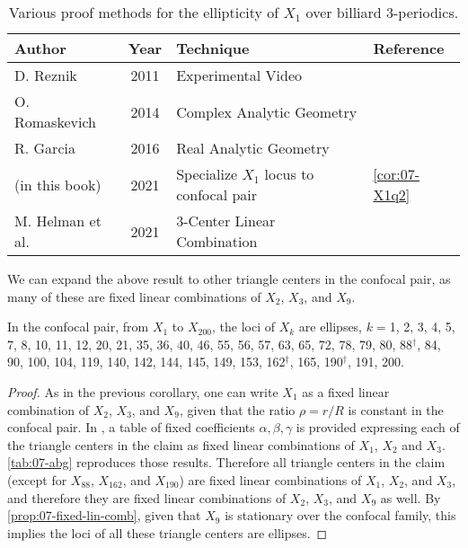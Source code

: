 \begin{table}
\begin{tabular}{|l|c|l|l|}
\hline
Author & Year & Technique  & Reference \\
\hline
D. Reznik        & 2011 & Experimental Video &  \cite{reznik2011-incenter} \\
O. Romaskevich   & 2014 & Complex Analytic  Geometry  &  \cite{olga14}  \\
R. Garcia        & 2016 & Real Analytic   Geometry &  \cite{ garcia2019-incenter}  \\
(in this book)   & 2021 & Specialize $X_1$ locus to confocal pair &  \cref{cor:07-X1q2}  \\
M. Helman et al. & 2021 & 3-Center Linear Combination  &  \cite{helman2021-theory} \\
\hline
\end{tabular}
\caption{Various proof methods for the ellipticity of $X_1$ over billiard 3-periodics.}
\label{tab:07-x1-methods}
\end{table}

We can expand the above result to other triangle centers in the confocal pair, as many of these are fixed linear combinations of $X_2$, $X_3$, and $X_9$. 

\begin{proposition}
In the confocal pair, from $X_1$ to $X_{200}$, the loci of $X_k$ are ellipses, $k=$1,  2,  3,  4,  5,  7,  8,  10,  11,  12,  20,  21,  35,  36,  40,  46,  55,  56,  57,  63,  65,  72,  78,  79,  80,  88$^\dagger$, 84,  90, 100, 104, 119, 140, 142, 144, 145, 149, 153, 162$^\dagger$, 165, 190$^\dagger$, 191, 200.
\end{proposition}

\begin{proof}
As in the previous corollary, one can write $X_1$ as a fixed linear combination of $X_2$, $X_3$, and $X_9$, given that the ratio $\rho=r/R$ is constant in the confocal pair.
In \cite[Table 2
]{helman2021-theory}, a table of fixed coefficients $\alpha,\beta,\gamma$ is provided expressing each of the triangle centers in the claim as fixed linear combinations of $X_1$, $X_2$ and $X_3$. \cref{tab:07-abg} reproduces those results. Therefore all triangle centers in the claim (except for $X_{88}$, $X_{162}$, and $X_{190}$) are fixed linear combinations of $X_1$, $X_2$, and $X_3$, and therefore they are fixed linear combinations of $X_2$, $X_3$, and $X_9$ as well. By \cref{prop:07-fixed-lin-comb}, given that $X_9$ is stationary over the confocal family, this implies the loci of all these triangle centers are ellipses.
\end{proof}


